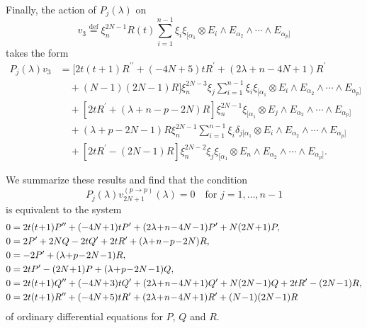 \documentclass[a4paper,12pt,reqno]{amsart}
\numberwithin{theorem}{subsection}
\numberwithin{equation}{section}
\begin{document}
Finally, the action of $P_j(\lambda)$ on
$$
   v_3 {\stackrel{\text{def}}{=}} \xi_n^{2N-1}R(t)\sum_{i=1}^{n-1}\xi_i\xi_{[\alpha_1}
   \otimes E_i\wedge E_{\alpha_2}\wedge\cdots\wedge E_{\alpha_p]}
$$
takes the form
\begin{align*}
    P_j(\lambda)v_3 & = \big[2t(t\!+\!1) R^{\prime\prime} + (-4N\!+\!5)tR^\prime +
    (2\lambda\!+\!n\!-\!4N\!+\!1)R^\prime\\
    & \quad + (N\!-\!1)(2N\!-\!1) R\big] \xi_n^{2N-3}\xi_j\sum_{i=1}^{n-1}\xi_i\xi_{[\alpha_1}
      \otimes E_i\wedge E_{\alpha_2}\wedge\cdots\wedge E_{\alpha_{p}]}\\
    & \quad + \left[2tR^\prime + (\lambda\!+\!n\!-\!p\!-\!2N) R\right] \xi_n^{2N-1}\xi_{[\alpha_1}
      \otimes E_j\wedge E_{\alpha_2}\wedge\cdots\wedge E_{\alpha_{p}]}\\
    & \quad + (\lambda\!+\!p\!-\!2N\!-\!1) R\xi_n^{2N-1}\sum_{i=1}^{n-1}\xi_i\delta_{j[\alpha_1}
      \otimes E_i\wedge E_{\alpha_2}\wedge\cdots\wedge E_{\alpha_{p}]}\\
    & \quad + \left[2tR^\prime - (2N\!-\!1)R\right] \xi_n^{2N-2}\xi_j \xi_{[\alpha_1}
      \otimes E_n\wedge E_{\alpha_2}\wedge\cdots\wedge E_{\alpha_{p}]}.
\end{align*}

We summarize these results and find that the condition
\begin{equation*}
   P_j(\lambda) v^{(p\to p)}_{2N+1}(\lambda) = 0 \quad \mbox{for $j=1,\dots,n-1$}
\end{equation*}
is equivalent to the system
\begin{align}\label{eq:OddSystemPtoP}
    0 & = 2t(t\!+\!1)P^{\prime\prime} + (-4N\!+\!1) tP^\prime
    + (2\lambda\!+\!n\!-\!4N\!-\!1)P^\prime + N(2N\!+\!1)P, \notag\\
    0 & = 2P^\prime + 2NQ - 2tQ^\prime + 2tR^\prime + (\lambda\!+\!n\!-\!p\!-\!2N)R, \notag\\
    0 & = -2P^\prime + (\lambda\!+\!p\!-\!2N\!-\!1) R,\notag\\
    0 & = 2tP^\prime - (2N\!+\!1)P + (\lambda\!+\!p\!-\!2N\!-\!1) Q,\notag\\
    0 & = 2t(t\!+\!1) Q^{\prime\prime} + (-4N\!+\!3)t Q^\prime
    + (2\lambda\!+\!n\!-\!4N\!+\!1) Q^\prime + N(2N\!-\!1)Q + 2 tR^\prime -(2N\!-\!1)R,\notag\\
    0 & = 2t(t\!+\!1)R^{\prime\prime}+ (-4N\!+\!5)t R^\prime + (2\lambda\!+\!n\!-\!4N\!+\!1) R^\prime
    +(N\!-\!1)(2N\!-\!1)R
\end{align}
of ordinary differential equations for $P$, $Q$ and $R$.
\end{document}

